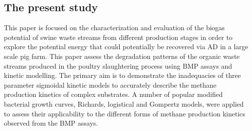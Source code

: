 \subsection{The present study}
This paper is focused on the characterization and evaluation of the biogas potential of swine waste streams from different production stages in order to explore the potential energy that could potentially be recovered via AD in a large scale pig farm. This paper assess the degradation patterns of the organic waste streams produced in the poultry slaughtering process using BMP assays and kinetic modelling. The primary aim is to demonstrate the inadequacies of three parameter sigmoidal kinetic models to accurately describe the methane production kinetics of complex substrates. A number of popular modified bacterial growth curves, Richards, logistical and Gompertz models, were applied to assess their applicability to the different forms of methane production kinetics observed from the BMP assays.